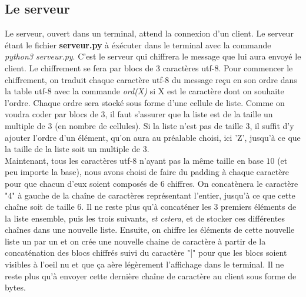 \documentclass[12pt]{article}
\theoremstyle{definition}
\begin{document}
	\subsection{Le serveur}
	Le serveur, ouvert dans un terminal, attend la connexion d'un client. Le serveur étant le fichier \textbf{serveur.py} à éxécuter dans le terminal avec la commande \textit{python3 serveur.py}.
	C'est le serveur qui chiffrera le message que lui aura envoyé le client. Le chiffrement se fera par blocs de $3$ caractères utf-8. Pour commencer le chiffrement, on traduit chaque caractère utf-8 du message reçu en son ordre dans la table utf-8 avec la commande \textit{ord(X)} si X est le caractère dont on souhaite l'ordre. Chaque ordre sera stocké sous forme d'une cellule de liste. Comme on voudra coder par blocs de 3, il faut s'assurer que la liste est de la taille un multiple de 3 (en nombre de cellules). Si la liste n'est pas de taille 3, il suffit d'y ajouter l'ordre d'un élément, qu'on aura au préalable choisi, ici 'Z', jusqu'à ce que la taille de la liste soit un multiple de 3.
\\
Maintenant, tous les caractères utf-8 n'ayant pas la même taille en base $10$ (et peu importe la base), nous avons choisi de faire du padding à chaque caractère pour que chacun d'eux soient composés de $6$ chiffres. On concatènera le caractère "4" à gauche de la chaîne de caractères représentant l'entier, jusqu'à ce que cette chaîne soit de taille $6$. %
Il ne reste plus qu'à concaténer les 3 premiers éléments de la liste ensemble, puis les trois suivants, \textit{et cetera}, et de stocker ces différentes chaînes dans une nouvelle liste. Ensuite, on chiffre les éléments de cette nouvelle liste un par un et on crée une nouvelle chaine de caractère à partir de la concaténation des blocs chiffrés suivi du caractère "|" pour que les blocs soient visibles à l'oeil nu et que ça aère légèrement l'affichage dans le terminal.
Il ne reste plus qu'à envoyer cette dernière chaîne de caractère au client sous forme de bytes. 
		
\end{document}
